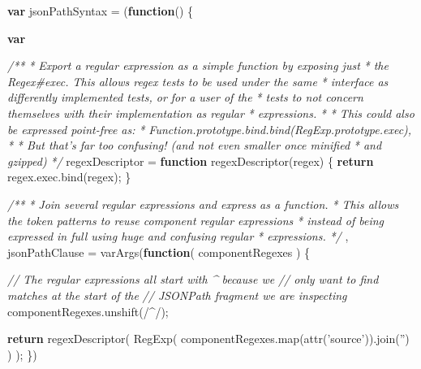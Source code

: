 \documentclass[]{article}
\newenvironment{Shaded}{}{}
\newcommand{\KeywordTok}[1]{\textcolor[rgb]{0.00,0.44,0.13}{\textbf{{#1}}}}
\newcommand{\FloatTok}[1]{\textcolor[rgb]{0.25,0.63,0.44}{{#1}}}
\newcommand{\StringTok}[1]{\textcolor[rgb]{0.25,0.44,0.63}{{#1}}}
\newcommand{\CommentTok}[1]{\textcolor[rgb]{0.38,0.63,0.69}{\textit{{#1}}}}
\newcommand{\OtherTok}[1]{\textcolor[rgb]{0.00,0.44,0.13}{{#1}}}
\newcommand{\FunctionTok}[1]{\textcolor[rgb]{0.02,0.16,0.49}{{#1}}}
\newcommand{\NormalTok}[1]{{#1}}
\begin{document}
\begin{Shaded}
\begin{Highlighting}[]
\KeywordTok{var} \NormalTok{jsonPathSyntax = (}\KeywordTok{function}\NormalTok{() \{}
 
   \KeywordTok{var}
   
   \CommentTok{/** }
\CommentTok{    * Export a regular expression as a simple function by exposing just }
\CommentTok{    * the Regex#exec. This allows regex tests to be used under the same }
\CommentTok{    * interface as differently implemented tests, or for a user of the}
\CommentTok{    * tests to not concern themselves with their implementation as regular}
\CommentTok{    * expressions.}
\CommentTok{    * }
\CommentTok{    * This could also be expressed point-free as:}
\CommentTok{    *   Function.prototype.bind.bind(RegExp.prototype.exec),}
\CommentTok{    *   }
\CommentTok{    * But that's far too confusing! (and not even smaller once minified }
\CommentTok{    * and gzipped)}
\CommentTok{    */}
       \NormalTok{regexDescriptor = }\KeywordTok{function} \FunctionTok{regexDescriptor}\NormalTok{(regex) \{}
            \KeywordTok{return} \OtherTok{regex}\NormalTok{.}\OtherTok{exec}\NormalTok{.}\FunctionTok{bind}\NormalTok{(regex);}
       \NormalTok{\}}
       
   \CommentTok{/**}
\CommentTok{    * Join several regular expressions and express as a function.}
\CommentTok{    * This allows the token patterns to reuse component regular expressions}
\CommentTok{    * instead of being expressed in full using huge and confusing regular}
\CommentTok{    * expressions.}
\CommentTok{    */}       
   \NormalTok{,   jsonPathClause = }\FunctionTok{varArgs}\NormalTok{(}\KeywordTok{function}\NormalTok{( componentRegexes ) \{}

            \CommentTok{// The regular expressions all start with ^ because we }
            \CommentTok{// only want to find matches at the start of the }
            \CommentTok{// JSONPath fragment we are inspecting           }
            \OtherTok{componentRegexes}\NormalTok{.}\FunctionTok{unshift}\NormalTok{(}\OtherTok{/}\FloatTok{^}\OtherTok{/}\NormalTok{);}
            
            \KeywordTok{return}   \FunctionTok{regexDescriptor}\NormalTok{(}
                        \FunctionTok{RegExp}\NormalTok{(}
                           \OtherTok{componentRegexes}\NormalTok{.}\FunctionTok{map}\NormalTok{(}\FunctionTok{attr}\NormalTok{(}\StringTok{'source'}\NormalTok{)).}\FunctionTok{join}\NormalTok{(}\StringTok{''}\NormalTok{)}
                        \NormalTok{)}
                     \NormalTok{);}
       \NormalTok{\})}
       

\end{Highlighting}
\end{Shaded}
\end{document}
